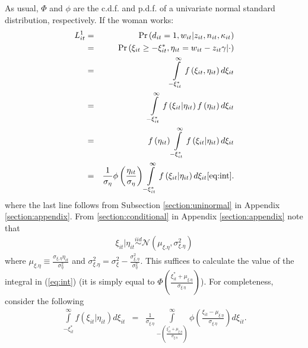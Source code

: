 \begin{exercise}
\noindent As usual, $\Phi$ and $\phi$ are the c.d.f. and p.d.f. of a univariate normal standard distribution, respectively. If the woman works: 
\begin{eqnarray}
L_{it}^1 &=& \Pr \left( d_{it} = 1 , w_{it} | z_{it}, n_{it}, \kappa_{it} \right) \nonumber \\
       &=& \Pr \left( \xi_{it} \geq - \xi_{it}^{*}, \eta_{it} = w_{it} - z_{it} \gamma | \cdot \right) \nonumber \nonumber \\
       &=& \int \limits _{-\xi_{it}^{*}} ^{\infty} f \left( \xi_{it}, \eta_{it} \right) d \xi_{it} \nonumber \\
       &=& \int \limits _{-\xi_{it}^{*}} ^{\infty} f \left( \xi_{it} | \eta_{it} \right) f \left( \eta_{it} \right) d \xi_{it} \nonumber \\
       &=& f \left( \eta_{it} \right) \int \limits _{-\xi_{it}^{*}} ^{\infty} f \left( \xi_{it} | \eta_{it} \right) d \xi_{it} \nonumber \\
       &=& \frac{1}{\sigma_{\eta}} \phi \left( \frac{\eta_{it}}{\sigma_{\eta}} \right) \int \limits _{-\xi_{it}^{*}} ^{\infty} f \left( \xi_{it} | \eta_{it} \right) d \xi_{it} \ref{eq:int}.
\end{eqnarray}
\noindent where the last line follows from Subsection \ref{section:uninormal} in Appendix \ref{section:appendix}. From \ref{section:conditional} in Appendix \ref{section:appendix} note that
\begin{eqnarray}
\xi_{it} | \eta_{it} \overset{iid}{\sim} \mathcal{N} \left( \mu_{\xi.\eta}, \sigma_{\xi.\eta}^2 \right)
\end{eqnarray}
\noindent where $\mu_{\xi.\eta} \equiv \frac{\sigma_{\xi, \eta} \eta_{it}}{\sigma_{\eta}^2}$ and $\sigma_{\xi.\eta}^2 = \sigma_{\xi}^2 - \frac{\sigma_{\xi,\eta}^2}{\sigma_{\eta}^2}$. This suffices to calculate the value of the integral in (\ref{eq:int}) (it is simply equal to $\Phi \left(  \frac{\xi_{it}^* + \mu_{\xi.\eta}}{\sigma_{\xi.\eta}}\right)$). For completeness, consider the following
\begin{eqnarray}
\int \limits _{-\xi_{it}^{*}} ^{\infty} f \left( \xi_{it} | \eta_{it} \right) d \xi_{it} &=& \frac{1}{\sigma_{\xi.\eta}} \int \limits _{-  \left( \frac{\xi_{it}^{*} + \mu_{\xi.\eta}}{\sigma_{\xi.\eta}}  \right) } ^{\infty} \phi \left( \frac{\xi_{it} - \mu_{\xi.\eta}}{\sigma_{\xi.\eta}}  \right) d\xi_{it}. \nonumber \\
\end{eqnarray}


\end{exercise}
